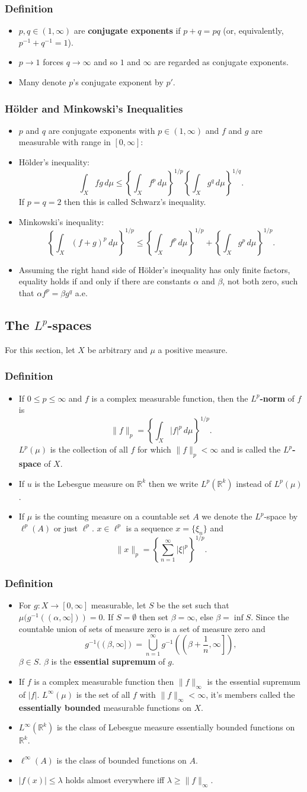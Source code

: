\documentclass{article}
\newcounter{topicnumber}[section]
\newcommand{\steptopic}[1][1]{\addtocounter{topicnumber}{#1}}
\newcommand{\material}[1]{%
\subsection*{#1}%
\addcontentsline{toc}{subsection}{#1}%
}
\newenvironment{topic}[1]{%
\steptopic%
\subsubsection{#1}%
\begin{itemize}%
}{%
\end{itemize}%
}
\newcommand{\term}[1]{{\bf #1}}
\newcommand{\setup}{\item[\null]}
\newcommand{\remark}{\item}
\newcommand{\note}{\item[{\em Note:}]}
\begin{document}
\begin{topic}{Definition}
\remark $p, q \in (1, \infty)$ are \term{conjugate exponents} if $p + q = pq$ (or, equivalently, $p^{-1} + q^{-1} = 1$).
\remark $p \to 1$ forces $q \to \infty$ and so $1$ and $\infty$ are regarded as conjugate exponents.
\remark Many denote $p$'s conjugate exponent by $p'$.
\end{topic}

\begin{topic}{H\"older and Minkowski's Inequalities}
\setup $p$ and $q$ are conjugate exponents with $p \in (1, \infty)$ and $f$ and $g$ are measurable with range in $[0, \infty]$:
\remark H\"older's inequality: $$\int_X fg\,d\mu \leq \left\{\int_X f^p\,d\mu\right\}^{1/p} \left\{\int_X g^q\,d\mu\right\}^{1/q}.$$ If $p = q = 2$ then this is called Schwarz's inequality.
\remark Minkowski's inequality: $$\left\{\int_X (f+g)^p\,d\mu\right\}^{1/p} \leq \left\{\int_X f^p\,d\mu\right\}^{1/p} + \left\{\int_X g^p\,d\mu\right\}^{1/p}.$$
\note Assuming the right hand side of H\"older's inequality has only finite factors, equality holds if and only if there are constants $\alpha$ and $\beta$, not both zero, such that $\alpha f^p = \beta g^q$ a.e.
\end{topic}


\material{The $L^p$-spaces}
For this section, let $X$ be arbitrary and $\mu$ a positive measure.

\begin{topic}{Definition}
\remark If $0 \leq p \leq \infty$ and $f$ is a complex measurable function, then the \term{$L^p$-norm} of $f$ is $$\|f\|_p = \left\{\int_X |f|^p\,d\mu\right\}^{1/p}.$$ $L^p(\mu)$ is the collection of all $f$ for which $\|f\|_p < \infty$ and is called the \term{$L^p$-space} of $X$.
\remark If $u$ is the Lebesgue measure on $\mathbb{R}^k$ then we write $L^p(\mathbb{R}^k)$ instead of $L^p(\mu)$.
\remark If $\mu$ is the counting measure on a countable set $A$ we denote the $L^p$-space by $\ell^p(A)$ or just $\ell^p$. $x \in \ell^p$ is a sequence $x = \{\xi_n\}$ and $$\|x\|_p = \left\{\sum_{n=1}^\infty |\xi|^p\right\}^{1/p}.$$
\end{topic}

\begin{topic}{Definition}
\remark For $g : X \to [0, \infty]$ measurable, let $S$ be the set such that $\mu(g^{-1}((\alpha, \infty])) = 0$. If $S = \emptyset$ then set $\beta = \infty$, else $\beta = \inf S$. Since the countable union of sets of measure zero is a set of measure zero and $$g^{-1}((\beta, \infty]) = \bigcup_{n=1}^\infty g^{-1}\left(\left(\beta + \dfrac{1}{n}, \infty\right]\right),$$ $\beta \in S$. $\beta$ is the \term{essential supremum} of $g$.
\remark If $f$ is a complex measurable function then $\|f\|_\infty$ is the essential supremum of $|f|$. $L^\infty(\mu)$ is the set of all $f$ with $\|f\|_\infty < \infty$, it's members called the \term{essentially bounded} measurable functions on $X$.
\remark $L^\infty(\mathbb{R}^k)$ is the class of Lebesgue measure essentially bounded functions on $\mathbb{R}^k$.
\remark $\ell^\infty(A)$ is the class of bounded functions on $A$.
\note $|f(x)| \leq \lambda$ holds almost everywhere iff $\lambda \geq \|f\|_\infty$.
\end{topic}
\end{document}
